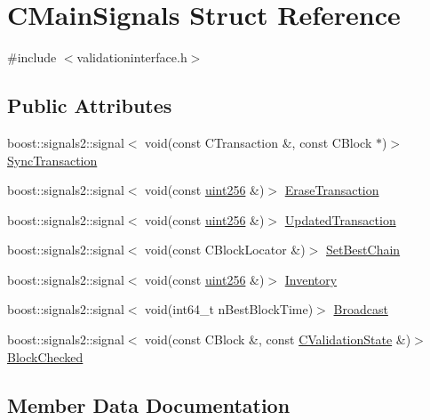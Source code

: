 \hypertarget{struct_c_main_signals}{}\section{C\+Main\+Signals Struct Reference}
\label{struct_c_main_signals}


{\ttfamily \#include $<$validationinterface.\+h$>$}

\subsection*{Public Attributes}
\begin{DoxyCompactItemize}
\item 
boost\+::signals2\+::signal$<$ void(const C\+Transaction \&, const C\+Block $\ast$)$>$ \hyperlink{struct_c_main_signals_a7ced7f332ed90d57110a78ad50d5a60f}{Sync\+Transaction}
\item 
boost\+::signals2\+::signal$<$ void(const \hyperlink{classuint256}{uint256} \&)$>$ \hyperlink{struct_c_main_signals_a1bb8e6808c2086e4045ecd8f356a12e4}{Erase\+Transaction}
\item 
boost\+::signals2\+::signal$<$ void(const \hyperlink{classuint256}{uint256} \&)$>$ \hyperlink{struct_c_main_signals_a460e5e468e8e4a9493fe1685b77c57e0}{Updated\+Transaction}
\item 
boost\+::signals2\+::signal$<$ void(const C\+Block\+Locator \&)$>$ \hyperlink{struct_c_main_signals_a11f2f18522ff7aa672eb5cc8c1f397b2}{Set\+Best\+Chain}
\item 
boost\+::signals2\+::signal$<$ void(const \hyperlink{classuint256}{uint256} \&)$>$ \hyperlink{struct_c_main_signals_a2f8f94d91265dc946e97614042698a7b}{Inventory}
\item 
boost\+::signals2\+::signal$<$ void(int64\+\_\+t n\+Best\+Block\+Time)$>$ \hyperlink{struct_c_main_signals_a57ba54e641838bc03d0bbda30796c0c9}{Broadcast}
\item 
boost\+::signals2\+::signal$<$ void(const C\+Block \&, const \hyperlink{class_c_validation_state}{C\+Validation\+State} \&)$>$ \hyperlink{struct_c_main_signals_a9419bb09211f46bdc7f214e9d94f1bd7}{Block\+Checked}
\end{DoxyCompactItemize}


\subsection{Member Data Documentation}
\hypertarget{struct_c_main_signals_a9419bb09211f46bdc7f214e9d94f1bd7}{}
